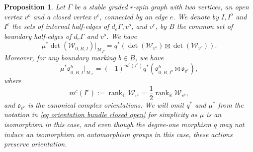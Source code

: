 \documentclass[11pt,a4paper]{article}
\newtheorem{prop}[dummy]{Proposition}
\theoremstyle{definition}
\theoremstyle{remark}
\numberwithin{equation}{section}
\def\Mbar{{\overline{\mathcal M}}}
\begin{document}
\begin{prop}\label{prop:orientation closed open}
    Let $\Gamma$ be a stable graded $r$-spin graph with two vertices, an open vertex $v^o$ and a closed vertex $v^c$, connected by an edge $e$.  We denote by $I,I^o$ and $I^c$ the sets of internal half-edges of $d_e\Gamma,v^o$, and $v^c$, by $B$ the common set of boundary half-edges of $d_e\Gamma$ and $v^o$. We have \begin{equation}\label{eq det decomp open open}
        \mu^*\det(\mathcal W_{0,\bar{B},I})\big|_{\Mbar_\Gamma} =  q^*\left(\det(\mathcal W_{v^o})\boxtimes \det(\mathcal W_{v^c})\right).
    \end{equation}
    Moreover, for any boundary marking $b\in B$, we have 
        \begin{equation}\label{eq orientation bundle closed open}
        \mu^*{\mathfrak{o}}^b_{0,\bar B,I}|_{\Mbar_\Gamma} = (-1)^{m^c(I^c)}q^*\left({\mathfrak{o}}^b_{0,\bar B,I^o}\boxtimes {\mathfrak{o}}_{v^c}\right),
        \end{equation}
       where  
        $$
        m^c(I^c):=\operatorname{rank}_{\mathbb C} \mathcal W_{v^c}=\frac{1}{2}\operatorname{rank}_{\mathbb R} \mathcal W_{v^c},
        $$
        and ${\mathfrak{o}}_{v^c}$ is the canonical complex orientations. We will omit $q^*$ and $\mu^*$ from the notation in \eqref{eq orientation bundle closed open} for simplicity as $\mu$ is an isomorphism in this case, and even though the degree-one morphism $q$ may not induce an isomorphism on automorphism groups in this case, these actions preserve orientation.

\end{prop}
\end{document}
